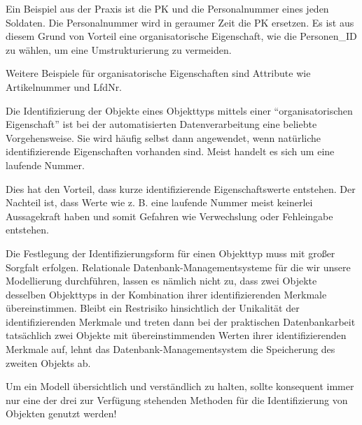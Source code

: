 Ein Beispiel aus der Praxis ist die PK und die Personalnummer eines
jeden Soldaten. Die Personalnummer wird in geraumer Zeit die PK
ersetzen. Es ist aus diesem Grund von Vorteil eine organisatorische
Eigenschaft, wie die Personen\_ID zu wählen, um eine
Umstrukturierung zu vermeiden.

Weitere Beispiele für organisatorische Eigenschaften sind Attribute wie Artikelnummer und LfdNr.

Die Identifizierung der Objekte eines Objekttyps mittels einer
\enquote{organisatorischen Eigenschaft} ist bei der automatisierten
Datenverarbeitung eine beliebte Vorgehensweise. Sie wird häufig
selbst dann angewendet, wenn natürliche identifizierende
Eigenschaften vorhanden sind. Meist handelt es sich um eine laufende
Nummer.

Dies hat den Vorteil, dass kurze identifizierende Eigenschaftswerte
entstehen. Der Nachteil ist, dass Werte wie z. B. eine laufende
Nummer meist keinerlei Aussagekraft haben und somit Gefahren wie
Verwechslung oder Fehleingabe entstehen.

Die Festlegung der Identifizierungsform für einen Objekttyp muss mit
großer Sorgfalt erfolgen. Relationale Datenbank-Managementsysteme
für die wir unsere Modellierung durch\-füh\-ren, lassen es
nämlich nicht zu, dass zwei Objekte desselben Objekttyps in der
Kombination ihrer identifizierenden Merkmale übereinstimmen. Bleibt
ein Restrisiko hinsichtlich der Unikalität der identifizierenden
Merkmale und treten dann bei der praktischen Datenbankarbeit
tatsächlich zwei Objekte mit übereinstimmenden Werten ihrer
identifizierenden Merkmale auf, lehnt das Datenbank-Managementsystem
die Speicherung des zweiten Objekts ab.

\begin{merke}
    Um ein Modell übersichtlich und verständlich zu halten, sollte
    konsequent immer nur eine der drei zur Verfügung stehenden
    Methoden für die Identifizierung von Objekten genutzt werden!
\end{merke}
